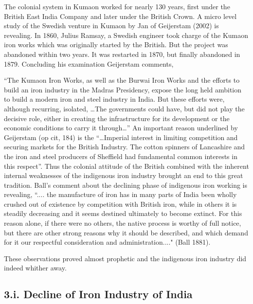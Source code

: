 The colonial system in Kumaon worked for nearly 130 years, first under the British East India Company and later under the British Crown. A micro level study of the Swedish venture in Kumaon by Jan of Geijerstam (2002) is revealing. In 1860, Julius Ramsay, a Swedish engineer took charge of the Kumaon iron works which was originally started by the British. But the project was abandoned within two years. It was restarted in 1870, but finally abandoned in 1879. Concluding his examination Geijerstam comments, 

\footnotesize{“The Kumaon Iron Works, as well as the Burwai Iron Works and the efforts to build an iron industry in the Madras Presidency, expose the long held ambition to build a modern iron and steel industry in India. But these efforts were, although recurring, isolated, …The governments could have, but did not play the decisive role, either in creating the infrastructure for its development or the economic conditions to carry it through…”} An important reason underlined by Geijerstam (op cit, 184) is the \footnotesize{“…Imperial interest in limiting competition and securing markets for the British Industry. The cotton spinners of Lancashire and the iron and steel producers of Sheffield had fundamental common interests in this respect”. Thus the colonial attitude of the British combined with the inherent internal weaknesses of the indigenous iron industry brought an end to this great tradition. Ball's comment about the declining phase of indigenous iron working is revealing, ``.... the manufacture of iron has in many parts of India been wholly crushed out of existence by competition with British iron, while in others it is steadily decreasing and it seems destined ultimately to become extinct.  For this reason alone, if there were no others, the native process is worthy of full notice, but there are other strong reasons why it should be described, and which demand for it our respectful consideration and administration...."} (Ball 1881).

These observations proved almost prophetic and the indigenous iron industry did indeed whither away. 

\subsection*{3.i.  Decline of Iron Industry of India}\label{chapter6-subsection-3.i}

\vspace{-.2cm}

